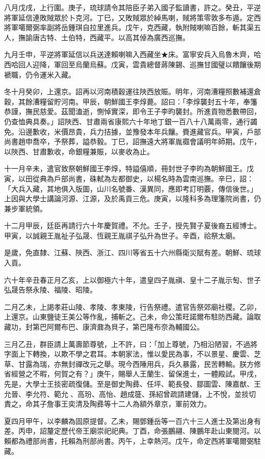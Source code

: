 \begin{pinyinscope}
八月戊戌，上行圍。庚子，琉球請令其陪臣子弟入國子監讀書，許之。癸丑，平逆將軍延信連敗賊眾於卜克河。丁巳，又敗賊眾於綽馬喇，賊將策零敦多布遁。定西將軍噶爾弼率副將岳鍾琪自拉里進兵。戊午，克西藏，執附賊喇嘛百餘，斬其渠五人，撫諭唐古特、土伯特，西藏平。以高其倬為廣西巡撫。

九月壬申，平逆將軍延信以兵送達賴喇嘛入西藏坐★床。富寧安兵入烏魯木齊，哈西哈回人迎降，軍回至烏蘭烏蘇。戊寅，雲貴總督蔣陳錫、巡撫甘國璧以饋饟後期褫職，仍令運米入藏。

冬十月癸卯，上還京。詔再以河南積穀運往陜西放賑。明年，河南漕糧照數補還倉穀，其餘漕糧留貯河南。甲辰，朝鮮國王李焞薨。詔曰：「李焞襲封五十年，奉籓恭謹，撫民慈愛。茲聞溘逝，惻悼實深，即令王子李昀襲封。所進貢物悉數帶回，仍查恤典具奏。」詔陜西、甘肅兩省康熙六十年地丁銀一百八十八萬兩零，通行蠲免。沿邊歉收，米價昂貴，兵力拮據，並豫發本年兵饟。賚進藏官兵。甲寅，戶部尚書趙申喬卒，予祭葬，謚恭毅。丁巳，詔撫遠大將軍胤禵會議明年師期。戊午，以陜西、甘肅歉收，命銀糧兼賑，以麥收為止。

十一月辛未，遣官致祭朝鮮國王李焞，特謚僖順，冊封世子李昀為朝鮮國王。戊寅，以田從典為戶部尚書，硃軾為左都御史，以楊名時為雲南巡撫。辛巳，詔：「大兵入藏，其地俱入版圖，山川名號番、漢異同，應即考訂明覈，傳信後世。」上因與大學士講論河源、江源，及於禹貢三危。庚寅，以隆科多為理籓院尚書，仍兼步軍統領。

十二月甲辰，廷臣再請行六十年慶賀禮。不允。壬子，授先賢子夏後裔五經博士。甲寅，以誠親王胤祉子弘晟、恆親王胤祺子弘升為世子。辛酉，祫祭太廟。

是歲，免直隸、江蘇、陜西、浙江、四川等省五十六州縣衛災賦有差。朝鮮、琉球入貢。

六十年辛丑春正月乙亥，上以御極六十年，遣皇四子胤禛、皇十二子胤示匋、世子弘晟告祭永陵、福陵、昭陵。

二月乙未，上謁孝莊山陵、孝陵、孝東陵，行告祭禮。遣官告祭郊廟社稷。乙卯，上還京。山東鹽徒王美公等作亂，捕斬之。己未，命公策旺諾爾布駐防西藏。論取藏功，封第巴阿爾布巴、康濟鼐為貝子，第巴隆布奈為輔國公。

三月乙丑，群臣請上萬壽節尊號，上不許，曰：「加上尊號，乃相沿陋習，不過將字面上下轉換，以欺不學之君耳。本朝家法，惟以愛民為事，不以景星、慶雲、芝草、甘露為瑞，亦無封禪改元之舉。現今西陲用兵，兵久暴露，民苦轉輸。朕方修省經營之不暇，何賀之有？」庚午，賜舉人王蘭生、留保進士，一體殿試。甲戌，先是，大學士王掞密疏復儲。至是御史陶彞、任坪、範長發、鄒圖雲、陳嘉猷、王允晉、李允符、範允、高玢、高怡、趙成簁、孫紹曾疏請建儲，上不悅，並掞切責之，命其子詹事王奕清及陶彞等十二人為額外章京，軍前效力。

夏四月甲午，以李麟為固原提督。乙未，賜鄧鍾岳等一百六十三人進士及第出身有差。丙申，詔釐定歷代帝王廟崇祀祀典。丁酉，命張鵬翮、陳鵬年赴山東閱河。以賴都為禮部尚書，托賴為刑部尚書。丙午，上幸熱河。戊午，命定西將軍噶爾弼駐藏。


\end{pinyinscope}
